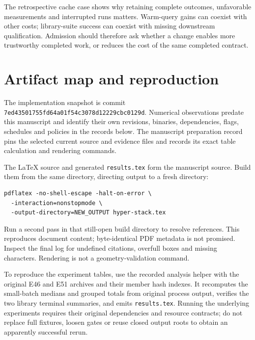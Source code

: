 \documentclass[11pt]{article}
\begin{document}
The retrospective cache case shows why retaining complete outcomes, unfavorable
measurements and interrupted runs matters. Warm-query gains can coexist with
other costs; library-suite success can coexist with missing downstream
qualification. Admission should therefore ask whether a change enables more
trustworthy completed work, or reduces the cost of the same completed contract.

\appendix
\section{Artifact map and reproduction}
The implementation snapshot is commit \texttt{7ed43501755fd64a01f54c3078d12229cbc0129d}.
Numerical observations predate this manuscript and identify their own revisions,
binaries, dependencies, flags, schedules and policies in the records below.
The manuscript preparation record pins the selected current source and evidence
files and records its exact table calculation and rendering commands.

The LaTeX source and generated \texttt{results.tex} form the manuscript source.
Build them from the same directory, directing output to a fresh directory:
\begin{verbatim}
pdflatex -no-shell-escape -halt-on-error \
  -interaction=nonstopmode \
  -output-directory=NEW_OUTPUT hyper-stack.tex
\end{verbatim}
Run a second pass in that still-open build directory to resolve references.
This reproduces document content; byte-identical PDF metadata is not promised.
Inspect the final log for undefined citations, overfull boxes and missing
characters. Rendering is not a geometry-validation command.

To reproduce the experiment tables, use the recorded analysis helper with the
original E46 and E51 archives and their member hash indexes. It recomputes the
small-batch medians and grouped totals from original process output, verifies the
two library terminal summaries, and emits \texttt{results.tex}. Running the
underlying experiments requires their original dependencies and resource
contracts; do not replace full fixtures, loosen gates or reuse closed output
roots to obtain an apparently successful rerun.
\end{document}
